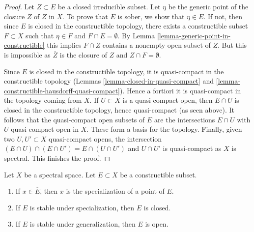 \begin{proof}
Let $Z \subset E$ be a closed irreducible subset. Let $\eta$ be the generic
point of the closure $\overline{Z}$ of $Z$ in $X$. To prove that $E$
is sober, we show that $\eta \in E$. If not, then since $E$ is closed
in the constructible topology, there exists a constructible subset
$F \subset X$ such that $\eta \in F$ and $F \cap E = \emptyset$.
By Lemma \ref{lemma-generic-point-in-constructible} this implies
$F \cap \overline{Z}$ contains a nonempty open subset of $\overline{Z}$.
But this is impossible as $\overline{Z}$ is the closure of $Z$ and
$Z \cap F = \emptyset$.

\medskip\noindent
Since $E$ is closed in the constructible topology, it is quasi-compact
in the constructible topology
(Lemmas \ref{lemma-closed-in-quasi-compact} and
\ref{lemma-constructible-hausdorff-quasi-compact}). Hence a fortiori it is
quasi-compact in the topology coming from $X$. If $U \subset X$
is a quasi-compact open, then $E \cap U$ is closed in the constructible
topology, hence quasi-compact (as seen above). It follows that the
quasi-compact open subsets of $E$ are the intersections $E \cap U$
with $U$ quasi-compact open in $X$. These form a basis for the topology.
Finally, given two $U, U' \subset X$ quasi-compact opens, the intersection
$(E \cap U) \cap (E \cap U') = E \cap (U \cap U')$ and $U \cap U'$
is quasi-compact as $X$ is spectral. This finishes the proof.
\end{proof}

\begin{lemma}
\label{lemma-constructible-stable-specialization-closed}
Let $X$ be a spectral space. Let $E \subset X$ be a constructible subset.
\begin{enumerate}
\item If $x \in \overline{E}$, then $x$ is the specialization of a point of
$E$.
\item If $E$ is stable under specialization, then $E$ is closed.
\item If $E$ is stable under generalization, then $E$ is open.
\end{enumerate}
\end{lemma}

